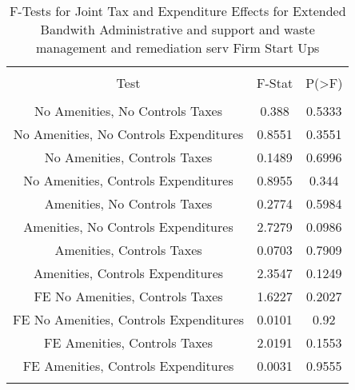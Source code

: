 
\begin{table}[!htbp] \centering 
  \caption{F-Tests for Joint Tax and Expenditure Effects for Extended Bandwith Administrative and support and waste management and remediation serv Firm Start Ups} 
  \label{56Ftests} 
\begin{tabular}{@{\extracolsep{5pt}} ccc} 
\\[-1.8ex]\hline 
\hline \\[-1.8ex] 
Test & F-Stat & P(\textgreater F) \\ 
\hline \\[-1.8ex] 
No Amenities, No Controls Taxes & 0.388 & 0.5333 \\ 
No Amenities, No Controls Expenditures & 0.8551 & 0.3551 \\ 
No Amenities, Controls Taxes & 0.1489 & 0.6996 \\ 
No Amenities, Controls Expenditures & 0.8955 & 0.344 \\ 
Amenities, No Controls Taxes & 0.2774 & 0.5984 \\ 
Amenities, No Controls Expenditures & 2.7279 & 0.0986 \\ 
Amenities, Controls Taxes & 0.0703 & 0.7909 \\ 
Amenities, Controls Expenditures & 2.3547 & 0.1249 \\ 
FE No Amenities, Controls Taxes & 1.6227 & 0.2027 \\ 
FE No Amenities, Controls Expenditures & 0.0101 & 0.92 \\ 
FE Amenities, Controls Taxes & 2.0191 & 0.1553 \\ 
FE Amenities, Controls Expenditures & 0.0031 & 0.9555 \\ 
\hline \\[-1.8ex] 
\end{tabular} 
\end{table} 
